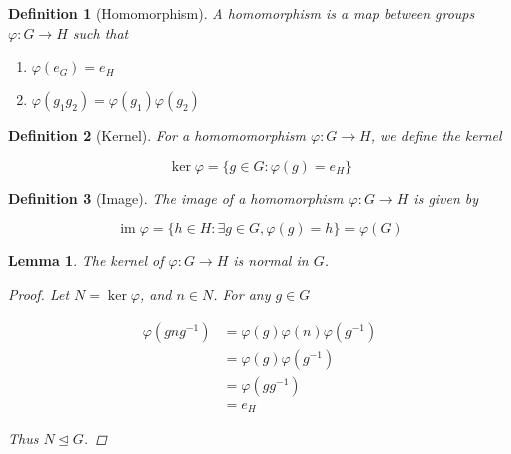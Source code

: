 \documentclass{article}
\newtheorem{lemma}{Lemma}
\newtheorem{mdef}{Definition}
\newcommand{\normal}{\trianglelefteq}
\DeclareMathOperator{\im}{im}
\begin{document}
\begin{mdef}[Homomorphism]
  A homomorphism is a map between groups $\varphi : G \to H$ such that

  \begin{enumerate}
  \item $\varphi(e_G) = e_H$
  \item $\varphi(g_1 g_2) = \varphi(g_1) \varphi(g_2)$
  \end{enumerate}
\end{mdef}

\begin{mdef}[Kernel]
  For a homomomorphism $\varphi : G \to H$, we define the kernel

  \[\ker \varphi = \{g \in G : \varphi(g) = e_H\}\]
\end{mdef}

\begin{mdef}[Image]
  The image of a homomorphism $\varphi : G \to H$ is given by

  \[\im \varphi = \{h \in H : \exists g \in G, \varphi(g) = h\} = \varphi(G)\]
\end{mdef}

\begin{lemma}
  The kernel of $\varphi : G \to H$ is normal in $G$.

  \begin{proof}
    Let $N = \ker \varphi$, and $n \in N$. For any $g \in G$

    \begin{align*}
      \varphi(gng^{-1}) &= \varphi(g) \varphi(n) \varphi(g^{-1})\\
      &= \varphi(g) \varphi(g^{-1})\\
      &= \varphi(g g^{-1})\\
      &= e_H
    \end{align*}

    Thus $N \normal G$.
  \end{proof}
\end{lemma}
\end{document}
